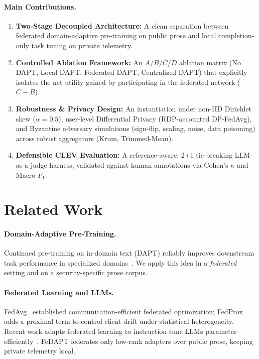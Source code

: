 \documentclass[11pt,a4paper]{article}
\begin{document}
\paragraph{Main Contributions.}
\begin{enumerate}
    \item \textbf{Two-Stage Decoupled Architecture:} A clean separation between federated domain-adaptive pre-training on public prose and local completion-only task tuning on private telemetry.
    \item \textbf{Controlled Ablation Framework:} An $A/B/C/D$ ablation matrix (No DAPT, Local DAPT, Federated DAPT, Centralized DAPT) that explicitly isolates the net utility gained by participating in the federated network ($C-B$).
    \item \textbf{Robustness \& Privacy Design:} An instantiation under non-IID Dirichlet skew ($\alpha{=}0.5$), user-level Differential Privacy (RDP-accounted DP-FedAvg), and Byzantine adversary simulations (sign-flip, scaling, noise, data poisoning) across robust aggregators (Krum, Trimmed-Mean).
    \item \textbf{Defensible CLEV Evaluation:} A reference-aware, 2+1 tie-breaking LLM-as-a-judge harness, validated against human annotations via Cohen's $\kappa$ and Macro-$F_1$.
\end{enumerate}

\section{Related Work}
\paragraph{Domain-Adaptive Pre-Training.} Continued pre-training on in-domain text (DAPT) reliably improves downstream task performance in specialized domains~\cite{gururangan2020dapt}. We apply this idea in a \emph{federated} setting and on a security-specific prose corpus.

\paragraph{Federated Learning and LLMs.} FedAvg~\cite{mcmahan2017fedavg} established communication-efficient federated optimization; FedProx~\cite{li2020fedprox} adds a proximal term to control client drift under statistical heterogeneity. Recent work adapts federated learning to instruction-tune LLMs parameter-efficiently~\cite{zhang2023fedit}. FeDAPT federates only low-rank adapters over public prose, keeping private telemetry local.
\end{document}
